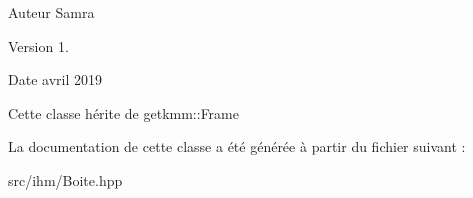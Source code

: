 \begin{DoxyAuthor}{Auteur}
Samra 
\end{DoxyAuthor}
\begin{DoxyVersion}{Version}
1. 
\end{DoxyVersion}
\begin{DoxyDate}{Date}
avril 2019
\end{DoxyDate}
Cette classe hérite de getkmm\+::\+Frame 

La documentation de cette classe a été générée à partir du fichier suivant \+:\begin{DoxyCompactItemize}
\item 
src/ihm/Boite.\+hpp\end{DoxyCompactItemize}
